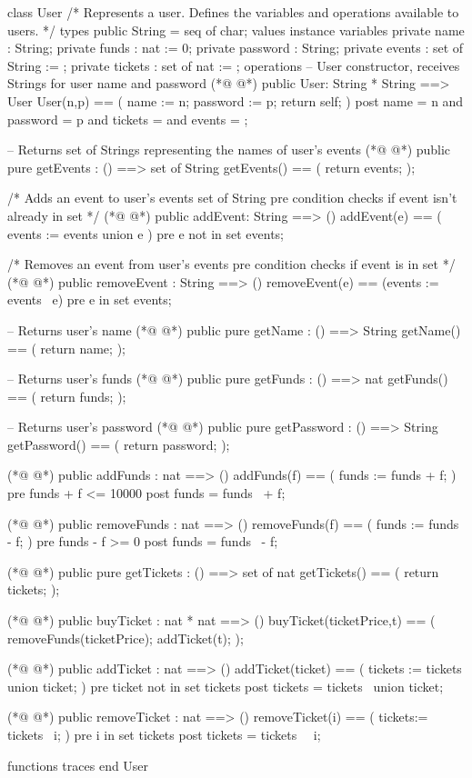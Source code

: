 \begin{vdmpp}[breaklines=true]
class User
/*
  Represents a user.
  Defines the variables and operations available to users.
*/
types
  public String = seq of char;
values
instance variables
 private name : String;
 private funds : nat := 0;
 private password : String;
 private events : set of String := {};
 private tickets : set of nat := {};
operations
 -- User constructor, receives Strings for user name and password
(*@
\label{User:17}
@*)
 public User: String * String ==> User
 User(n,p) == (
  name := n;
  password := p;
  return self;
 )
 post name = n and password = p and tickets = {} and events = {};
 
 -- Returns set of Strings representing the names of user's events
(*@
\label{getEvents:26}
@*)
 public pure getEvents : () ==> set of String
 getEvents() == (
  return events;
 );
 
 /*
  Adds an event to user's events set of String
  pre condition checks if event isn't already in set
 */ 
(*@
\label{addEvent:35}
@*)
 public addEvent: String ==> ()
 addEvent(e) == (
  events := events union {e}
 )
 pre e not in set events;
 
 /*
  Removes an event from user's events
  pre condition checks if event is in set
 */ 
(*@
\label{removeEvent:45}
@*)
 public removeEvent : String ==> ()
 removeEvent(e) == (events := events \ {e})
 pre e in set events;
 
 -- Returns user's name
(*@
\label{getName:50}
@*)
 public pure getName : () ==> String
 getName() == (
  return name;
 );
 
 -- Returns user's funds
(*@
\label{getFunds:56}
@*)
 public pure getFunds : () ==> nat
 getFunds() == (
  return funds;
 );
 
 -- Returns user's password
(*@
\label{getPassword:62}
@*)
 public pure getPassword : () ==> String
 getPassword() == (
  return password;
 );
 
(*@
\label{addFunds:67}
@*)
 public addFunds : nat ==> ()
 addFunds(f) == (
  funds := funds + f;
 )
 pre funds + f <= 10000
 post funds = funds~ + f;
 
(*@
\label{removeFunds:74}
@*)
 public removeFunds : nat ==> ()
 removeFunds(f) == (
  funds := funds - f;
 )
 pre funds - f >= 0
 post funds = funds~ - f;
 
(*@
\label{getTickets:81}
@*)
 public pure getTickets : () ==> set of nat
  getTickets() == (
  return tickets;
 );
 
(*@
\label{buyTicket:86}
@*)
 public buyTicket : nat * nat ==> ()
 buyTicket(ticketPrice,t) == (
  removeFunds(ticketPrice);
  addTicket(t);
 );
 
(*@
\label{addTicket:92}
@*)
 public addTicket : nat ==> ()
 addTicket(ticket) == (
  tickets := tickets union {ticket};
 )
 pre ticket not in set tickets
 post tickets = tickets~ union {ticket};
 
(*@
\label{removeTicket:99}
@*)
 public removeTicket : nat ==> ()
 removeTicket(i) == (
  tickets:= tickets \ {i}; 
 )
 pre i in set tickets
 post tickets = tickets~ \ {i}; 
 
functions
traces
end User
\end{vdmpp}
